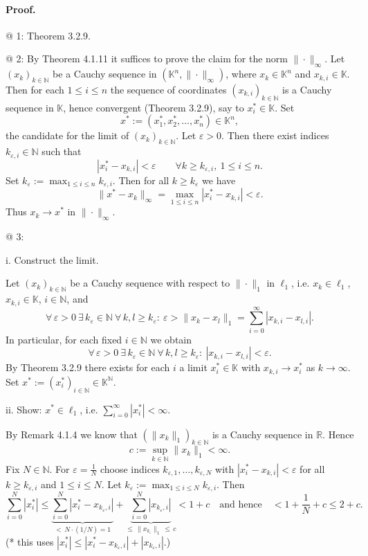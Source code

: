 \documentclass[12pt,a4paper]{article}
\newcommand{\N}{\mathbb{N}}
\newcommand{\R}{\mathbb{R}}
\newcommand{\K}{\mathbb{K}} %
\newcommand{\eps}{\varepsilon}
\theoremstyle{plain}
\theoremstyle{definition}
\theoremstyle{remark}
\begin{document}
\paragraph{Proof.}
@ 1: Theorem 3.2.9.

@ 2: By Theorem 4.1.11 it suffices to prove the claim for the norm $\|\cdot\|_\infty$. Let $(x_k)_{k\in\N}$ be a Cauchy sequence in $(\K^{n},\|\cdot\|_{\infty})$, where $x_k\in\K^n$ and $x_{k,i}\in\K$. Then for each $1\le i\le n$ the sequence of coordinates $(x_{k,i})_{k\in\N}$ is a Cauchy sequence in $\K$, hence convergent (Theorem 3.2.9), say to $x_i^{\ast}\in\K$. Set
\[
	x^{\ast} := (x_1^{\ast},x_2^{\ast},\dots,x_n^{\ast}) \in \K^{n},
\]
the candidate for the limit of $(x_k)_{k\in\N}$. Let $\eps>0$. Then there exist indices $k_{\eps,i}\in\N$ such that
\[
	|x_i^{\ast}-x_{k,i}| < \eps \qquad \forall k\ge k_{\eps,i},\ 1\le i\le n.
\]
Set $k_{\eps} := \max_{1\le i\le n} k_{\eps,i}$. Then for all $k\ge k_{\eps}$ we have
\[
	\|x^{\ast}-x_k\|_{\infty} 
	 = \max_{1\le i\le n} |x_i^{\ast}-x_{k,i}| 
	 < \eps.
\]
Thus $x_k\to x^{\ast}$ in $\|\cdot\|_{\infty}$.

@ 3:

i. Construct the limit.

Let $(x_k)_{k\in\N}$ be a Cauchy sequence with respect to $\|\cdot\|_{1}$ in $\ell_{1}$, i.e. $x_k\in\ell_{1}$, $x_{k,i}\in\K$, $i\in\N$, and
\[
	\forall\,\eps>0\ \exists\,k_{\eps}\in\N\ \forall\,k,l\ge k_{\eps} :\ \eps > \|x_k-x_l\|_{1} 
		= \sum_{i=0}^{\infty} |x_{k,i}-x_{l,i}|.
\]
In particular, for each fixed $i\in\N$ we obtain
\[
	\forall\,\eps>0\ \exists\,k_{\eps}\in\N\ \forall\,k,l\ge k_{\eps} :\ |x_{k,i}-x_{l,i}|<\eps.
\]
By Theorem 3.2.9 there exists for each $i$ a limit $x_i^{\ast}\in\K$ with $x_{k,i}\to x_i^{\ast}$ as $k\to\infty$. Set $x^{\ast}:=(x_i^{\ast})_{i\in\N}\in\K^{\N}$.

ii. Show: $x^{\ast}\in \ell_{1}$, i.e. $\sum_{i=0}^{\infty} |x_i^{\ast}| < \infty$.

By Remark 4.1.4 we know that $(\|x_k\|_{1})_{k\in\N}$ is a Cauchy sequence in $\R$. Hence
\[
	c := \sup_{k\in\N} \|x_k\|_{1} < \infty.
\]
Fix $N\in\N$. For $\eps=\tfrac{1}{N}$ choose indices $k_{\eps,1},\dots,k_{\eps,N}$ with $|x_i^{\ast}-x_{k,i}|<\eps$ for all $k\ge k_{\eps,i}$ and $1\le i\le N$. Let $k_{\eps}:=\max_{1\le i\le N} k_{\eps,i}$. Then
\[
	\sum_{i=0}^{N} |x_i^{\ast}|
		\le \underbrace{\sum_{i=0}^{N} |x_i^{\ast}-x_{k_{\eps},i}|}_{<\,N\cdot(1/N)=1}
			+ \underbrace{\sum_{i=0}^{N} |x_{k_{\eps},i}|}_{\le\,\|x_{k_{\eps}}\|_{1}\,\le\,c}
		< 1 + c \quad \text{and hence} \quad < 1 + \frac{1}{N} + c \le 2+c.
\]
(* this uses $|x_i^{\ast}| \le |x_i^{\ast}-x_{k_{\eps},i}| + |x_{k_{\eps},i}|$.)
\end{document}
